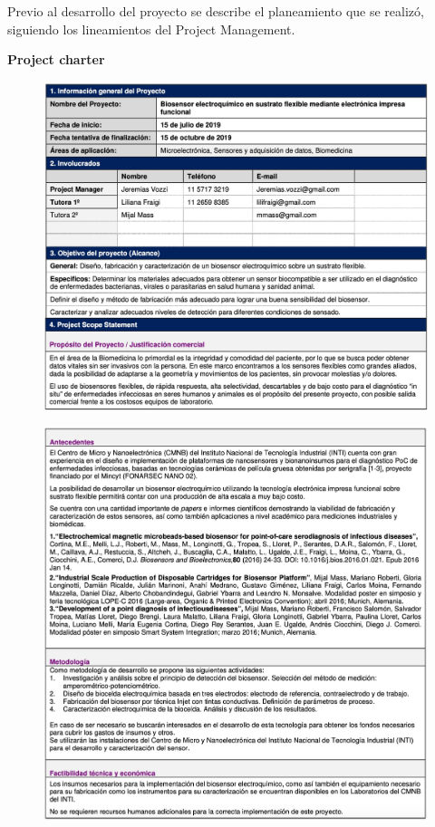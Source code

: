 Previo al desarrollo del proyecto se describe el planeamiento que se realizó, siguiendo los lineamientos del Project Management.
\\
\begin{flushleft}
{\Large \textbf{Project charter}}
\end{flushleft}
\begin{figure}[H]
  \centering
    \includegraphics[width=1\textwidth]{Figuras/ProjChart1}
  \label{fig:ProjChart1}
\end{figure}
\begin{figure}[H]
  \centering
    \includegraphics[width=1\textwidth]{Figuras/ProjChart2}
  \label{fig:ProjChart2}
\end{figure}
